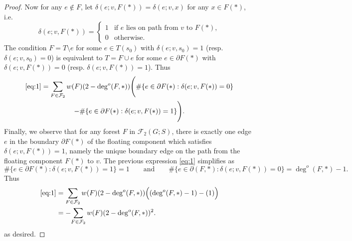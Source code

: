 \documentclass{amsart}
\theoremstyle{definition}
\newcommand{\one}{\mathds{1}}
\newcommand{\trees}{\mathcal{F}_1}
\newcommand{\forests}{\mathcal{F}}
\newcommand{\degout}{\deg^o}
\begin{document}
\begin{proof}
Now for any $e \not\in F$, let $\delta(e; v, F(*)) = \delta(e; v, x)$ for any $x \in F(*)$, i.e.
\[
	\delta(e; v, F(*)) = \begin{cases}
	1 &\text{if $e$ lies on path from $v$ to $F(*)$}, \\
	0 &\text{otherwise}.
	\end{cases}
\]
The condition $F = T \setminus e$ for some $e \in T(s_0)$ with $\delta(e; v, s_0) = 1$ (resp. $\delta(e; v, s_0) = 0$) is equivalent to $T = F \cup e$ for some $e \in \partial F(*)$ with $\delta(e; v, F(*)) = 0$ (resp. $\delta(e; v, F(*)) = 1$).
Thus
\begin{multline}
	\eqref{eq:1} = \sum_{F \in \forests_2} w(F) (2 - \deg^o(F,*))  \Bigg( \#\{e \in \partial F(*) : \delta(e; v, F(*)) = 0 \}  \\
	- \#\{e \in \partial F(*) : \delta(e; v, F(*)) = 1 \}  \Bigg).
\end{multline}
Finally, we observe that for any forest $F$ in $\forests_2(G;S)$,
there is exactly one edge $e$ in the boundary $\partial F(*)$ of the floating component which satisfies $\delta(e; v, F(*)) = 1$, namely the unique boundary edge on the path from the floating component $F(*)$ to $v$.
The previous expression \eqref{eq:1} simplifies as
\[
	\#\{e \in \partial F(*) : \delta(e;v, F(*)) = 1 \} = 1
\qquad\text{and}\qquad
	\#\{e \in \partial (F,*) : \delta(e;v, F(*)) = 0 \} = \deg^o(F,*) - 1 .
\]
Thus
\begin{align*}
	\eqref{eq:1} &= \sum_{F \in \forests_2} w(F) (2 - \degout(F,*))  \Big( (\degout(F,*) - 1)  - (1) \Big) \\
	&= - \!\sum_{F \in \forests_2} w(F) (2 - \degout(F,*))^2 .
\end{align*}
as desired.
\end{proof}
\end{document}
